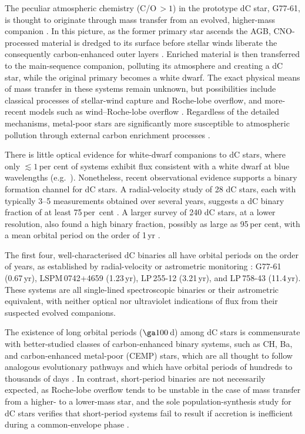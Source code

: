 \documentclass[fleqn,usenatbib,useAMS]{mnras}
\begin{document}
The peculiar atmospheric chemistry (C/O$\,>1$) in the prototype dC star, G77-61, is thought to originate through mass transfer from an evolved, higher-mass companion \citep{Dearborn86}.  In this picture, as the former primary star ascends the AGB, CNO-processed material is dredged to its surface before stellar winds liberate the consequently carbon-enhanced outer layers \citep{Iben}.  Enriched material is then transferred to the main-sequence companion, polluting its atmosphere and creating a dC star, while the original primary becomes a white dwarf.  The exact physical means of mass transfer in these systems remain unknown, but possibilities include classical processes of stellar-wind capture and Roche-lobe overflow, and more-recent models such as wind--Roche-lobe overflow \citep{Abate13}.  Regardless of the detailed mechanisms, metal-poor stars are significantly more susceptible to atmospheric pollution through external carbon enrichment processes \citep{Kool95}.

There is little optical evidence for white-dwarf companions to dC stars, where only $\lesssim1$\,per cent of systems exhibit flux consistent with a white dwarf at blue wavelengths (e.g.\ \citealt{Heber93,Liebert1994,Green2013}).  Nonetheless, recent observational evidence supports a binary formation channel for dC stars.  A radial-velocity study of 28 dC stars, each with typically 3--5 measurements obtained over several years, suggests a dC binary fraction of at least 75\,per~cent \citep{Whitehouse18}.  A larger survey of 240 dC stars, at a lower resolution, also found a high binary fraction, possibly as large as 95\,per cent, with a mean orbital period on the order of 1\,yr \citep{Roulston19}.

The first four, well-characterised dC binaries all have orbital periods on the order of years, as established by radial-velocity or astrometric monitoring \citep{Dearborn86,Harris18}: G77-61 (0.67\,yr), LSPM\,0742+4659 (1.23\,yr), LP\,255-12 (3.21\,yr), and LP\,758-43 (11.4\,yr).  These systems are all single-lined spectroscopic binaries or their astrometric equivalent, with neither optical nor ultraviolet indications of flux from their suspected evolved companions.  

The existence of long orbital periods ($\ga100$\,d) among dC stars is commensurate with better-studied classes of carbon-enhanced binary systems, such as CH, Ba, and carbon-enhanced metal-poor (CEMP) stars, which are all thought to follow analogous evolutionary pathways and which have orbital periods of hundreds to thousands of days \citep{CH,Ba,Cemps}.  In contrast, short-period binaries are not necessarily expected, as Roche-lobe overflow tends to be unstable in the case of mass transfer from a higher- to a lower-mass star, and the sole population-synthesis study for dC stars verifies that short-period systems fail to result if accretion is inefficient during a common-envelope phase \citep{Kool95}.  
\end{document}
